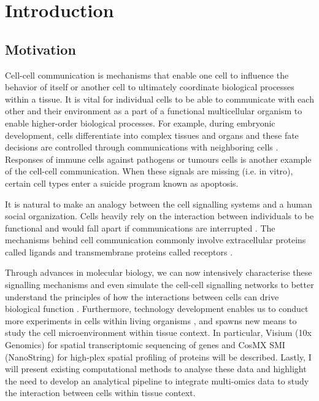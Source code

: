 \chapter[Introduction]{Introduction}
\label{Chap:Intro}


\section{Motivation}

Cell-cell communication is mechanisms that enable one cell to influence the behavior of itself or another cell to ultimately coordinate biological processes within a tissue. It is vital for individual cells to be able to communicate with each other and their environment as a part of a functional multicellular organism to enable higher-order biological processes. For example, during embryonic development, cells differentiate into complex tissues and organs and these fate decisions are controlled through communications with neighboring cells \cite{gale1996eph, eichmann1997ligand}. Responses of immune cells against pathogens or tumours cells is another example of the cell-cell communication. When these signals are missing (i.e. in vitro), certain cell types enter a suicide program known as apoptosis. 

It is natural to make an analogy between the cell signalling systems and a human social organization. Cells heavily rely on the interaction between individuals to be functional and would fall apart if communications are interrupted \cite{bartee2018principles}. The mechanisms behind cell communication commonly involve extracellular proteins called ligands and transmembrane proteins called receptors \cite{alberts2018molecular}. 

Through advances in molecular biology, we can now intensively characterise these signalling mechanisms and even simulate the cell-cell signalling networks to better understand the principles of how the interactions between cells can drive biological function \cite{sprinzak2010cis, teague2016synthetic, toda2019engineering}. Furthermore, technology development enables us to conduct more experiments in cells within living organisms \cite{helmchen2005deep, periasamy2013methods}, and spawns new means to study the cell microenvironment within tissue context. In particular, Visium (10x Genomics) for spatial transcriptomic sequencing of genes and CosMX SMI (NanoString) for high-plex spatial profiling of proteins will be described. Lastly, I will present existing computational methods to analyse these data and highlight the need to develop an analytical pipeline to integrate multi-omics data to study the interaction between cells within tissue context.      


